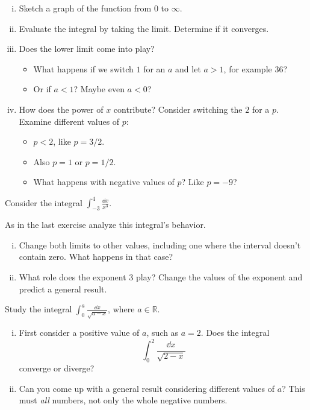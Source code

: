 \documentclass[12pt]{article}
\theoremstyle{plain}
\theoremstyle{definition}
\theoremstyle{remark}
\newcommand{\bR}{\mathbb{R}}        %
\renewcommand{\:}{\colon}           %
\renewcommand{\.}{\Cdot}                %
\begin{document}
\begin{multicols}{2}
\begin{ptcbP}
\begin{enumerate}[i)]
  \itemsep=-0.4em 
  \item Sketch a graph of the function from $0$ to $\infty$.
  \item Evaluate the integral by taking the limit. Determine if it converges.
  \item Does the lower limit come into play? 
  \vspace*{-0.5em}
  \begin{itemize}
    \itemsep=-0.37em
    \item What happens if we switch $1$ for an $a$ and let $a>1$, for example $36$?
    \item Or if $a<1$? Maybe even $a<0$?
  \end{itemize}  
  \item How does the power of $x$ contribute? Consider switching the $2$ for a $p$. Examine different values of $p$: 
 \vspace*{-0.5em}
  \begin{itemize}
    \itemsep=-0.37em
    \item $p<2$, like $p=3/2$.
    \item Also $p=1$ or $p=1/2$.
    \item What happens with negative values of $p$? Like $p=-9$?
  \end{itemize}
 \end{enumerate}
  \end{ptcbP}

  \begin{ptcbP}
    Consider the integral $\displaystyle\int_{-3}^{4}\frac{\dd x}{x^3}$.\par 
    As in the last exercise analyze this integral's behavior.\vspace*{-0.5em}
    \begin{enumerate}[i)]
      \itemsep=-0.4em
      \item Change both limits to other values, including one where the interval doesn't contain zero. What happens in that case?
      \item What role does the exponent $3$ play? Change the values of the exponent and predict a general result.
    \end{enumerate}
  \end{ptcbP}


  \begin{ptcbP}
    Study the integral $\displaystyle\int_{0}^{a}\frac{\dd x}{\sqrt{a-x}}$, where $a\in\bR$.\vspace*{-0.5em}
    \begin{enumerate}[i)]
      \itemsep=-0.4em
      \item First consider a positive value of $a$, such as $a=2$. Does the integral 
      $$\int_{0}^{2}\frac{\dd x}{\sqrt{2-x}}$$
      converge or diverge? 
      \item Can you come up with a general result considering different values of $a$? This must \emph{all} numbers, not only the whole negative numbers.
    \end{enumerate}
  \end{ptcbP}


\end{multicols}
\end{document}
